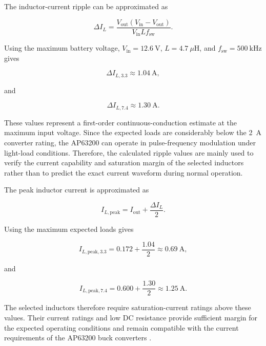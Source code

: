 The inductor-current ripple can be approximated as

\begin{equation}
\Delta I_L =
\frac{V_{\mathrm{out}}
\left(V_{\mathrm{in}}-V_{\mathrm{out}}\right)}
{V_{\mathrm{in}}L f_{\mathrm{sw}}}.
\label{eq:buck_inductor_ripple}
\end{equation}

Using the maximum battery voltage,
$V_{\mathrm{in}}=12.6~\mathrm{V}$,
$L=4.7~\mu\mathrm{H}$, and
$f_{\mathrm{sw}}=500~\mathrm{kHz}$ gives

\begin{equation}
\Delta I_{L,3.3}
\approx 1.04~\mathrm{A},
\end{equation}

and

\begin{equation}
\Delta I_{L,7.4}
\approx 1.30~\mathrm{A}.
\end{equation}

These values represent a first-order continuous-conduction estimate at the maximum input voltage. Since the expected loads are considerably below the 2~A converter rating, the AP63200 can operate in pulse-frequency modulation under light-load conditions. Therefore, the calculated ripple values are mainly used to verify the current capability and saturation margin of the selected inductors rather than to predict the exact current waveform during normal operation.

The peak inductor current is approximated as

\begin{equation}
I_{L,\mathrm{peak}}
=
I_{\mathrm{out}}
+
\frac{\Delta I_L}{2}.
\end{equation}

Using the maximum expected loads gives

\begin{equation}
I_{L,\mathrm{peak},3.3}
=
0.172+\frac{1.04}{2}
\approx 0.69~\mathrm{A},
\end{equation}

and

\begin{equation}
I_{L,\mathrm{peak},7.4}
=
0.600+\frac{1.30}{2}
\approx 1.25~\mathrm{A}.
\end{equation}

The selected inductors therefore require saturation-current ratings above these values. Their current ratings and low DC resistance provide sufficient margin for the expected operating conditions and remain compatible with the current requirements of the AP63200 buck converters \cite{AP63}.

